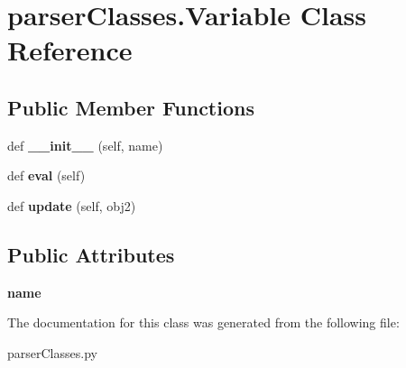 \hypertarget{classparser_classes_1_1_variable}{}\section{parser\+Classes.\+Variable Class Reference}
\label{classparser_classes_1_1_variable}
\subsection*{Public Member Functions}
\begin{DoxyCompactItemize}
\item 
def {\bfseries \+\_\+\+\_\+init\+\_\+\+\_\+} (self, name)\hypertarget{classparser_classes_1_1_variable_a96d789a80a5bcb1246ddcf6ff9a53fd5}{}\label{classparser_classes_1_1_variable_a96d789a80a5bcb1246ddcf6ff9a53fd5}

\item 
def {\bfseries eval} (self)\hypertarget{classparser_classes_1_1_variable_a252b110790e003233c628e748f620fc1}{}\label{classparser_classes_1_1_variable_a252b110790e003233c628e748f620fc1}

\item 
def {\bfseries update} (self, obj2)\hypertarget{classparser_classes_1_1_variable_a53b0e8b8172450a6d2200161a6706118}{}\label{classparser_classes_1_1_variable_a53b0e8b8172450a6d2200161a6706118}

\end{DoxyCompactItemize}
\subsection*{Public Attributes}
\begin{DoxyCompactItemize}
\item 
{\bfseries name}\hypertarget{classparser_classes_1_1_variable_aab7cba9066f629ddacf7c6fc13413979}{}\label{classparser_classes_1_1_variable_aab7cba9066f629ddacf7c6fc13413979}

\end{DoxyCompactItemize}


The documentation for this class was generated from the following file\+:\begin{DoxyCompactItemize}
\item 
parser\+Classes.\+py\end{DoxyCompactItemize}
